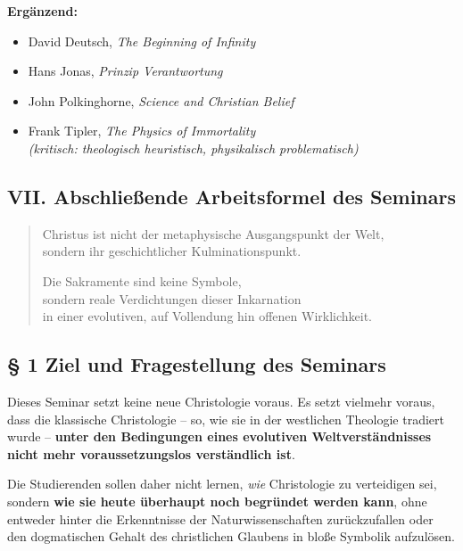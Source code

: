 \documentclass[
]{article}
\begin{document}
\textbf{Ergänzend:}

\begin{itemize}
\item
  David Deutsch, \emph{The Beginning of Infinity}
\item
  Hans Jonas, \emph{Prinzip Verantwortung}
\item
  John Polkinghorne, \emph{Science and Christian Belief}
\item
  Frank Tipler, \emph{The Physics of Immortality\\
  (kritisch: theologisch heuristisch, physikalisch problematisch)}
\end{itemize}

\subsection{\texorpdfstring{\textbf{VII. Abschließende Arbeitsformel des Seminars}}{VII. Abschließende Arbeitsformel des Seminars}}\label{vii.-abschlieuxdfende-arbeitsformel-des-seminars}

\begin{quote}
Christus ist nicht der metaphysische Ausgangspunkt der Welt,\\
sondern ihr geschichtlicher Kulminationspunkt.

Die Sakramente sind keine Symbole,\\
sondern reale Verdichtungen dieser Inkarnation\\
in einer evolutiven, auf Vollendung hin offenen Wirklichkeit.
\end{quote}

\subsection{\texorpdfstring{\textbf{§ 1 Ziel und Fragestellung des Seminars}}{§ 1 Ziel und Fragestellung des Seminars}}\label{ziel-und-fragestellung-des-seminars}

Dieses Seminar setzt keine neue Christologie voraus. Es setzt vielmehr voraus, dass die klassische Christologie -- so, wie sie in der westlichen Theologie tradiert wurde -- \textbf{unter den Bedingungen eines evolutiven Weltverständnisses nicht mehr voraussetzungslos verständlich ist}.

Die Studierenden sollen daher nicht lernen, \emph{wie} Christologie zu verteidigen sei, sondern \textbf{wie sie heute überhaupt noch begründet werden kann}, ohne entweder hinter die Erkenntnisse der Naturwissenschaften zurückzufallen oder den dogmatischen Gehalt des christlichen Glaubens in bloße Symbolik aufzulösen.
\end{document}
